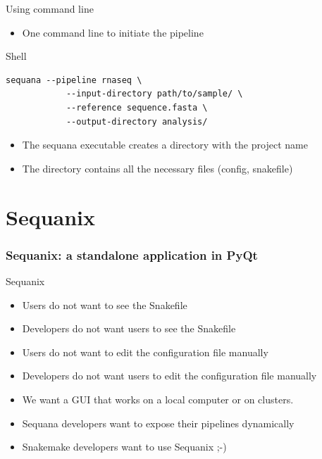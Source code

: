 \documentclass{beamer}
\begin{document}
\begin{frame}[fragile]{Using command line}
    \begin{itemize}
        \item One command line to initiate the pipeline
    \end{itemize}
    \begin{exampleblock}{Shell}
    \begin{lstlisting}[language={}]
    sequana --pipeline rnaseq \
            --input-directory path/to/sample/ \
            --reference sequence.fasta \
            --output-directory analysis/
    \end{lstlisting}
    \end{exampleblock}
    \begin{itemize}
        \item The sequana executable creates a directory with the project name
        \item The directory contains all the necessary files (config, snakefile)
    \end{itemize}
\end{frame}

\section{Sequanix}

\begin{frame}
\frametitle{Sequanix: a standalone application in PyQt}

\begin{block}{Sequanix}
\begin{itemize}
 \item Users do not want to see the Snakefile
 \item Developers do not want users to see the Snakefile
 \pause
 \item Users do not want to edit the configuration file manually
 \item Developers do not want users to edit the configuration file manually
 \pause
 \item We want a GUI that works on a local computer or on clusters.
 \pause
 \item Sequana developers want to expose their pipelines dynamically
 \pause
 \item Snakemake developers want to use Sequanix ;-) 
\end{itemize}
\end{block}
\end{frame}
\end{document}
